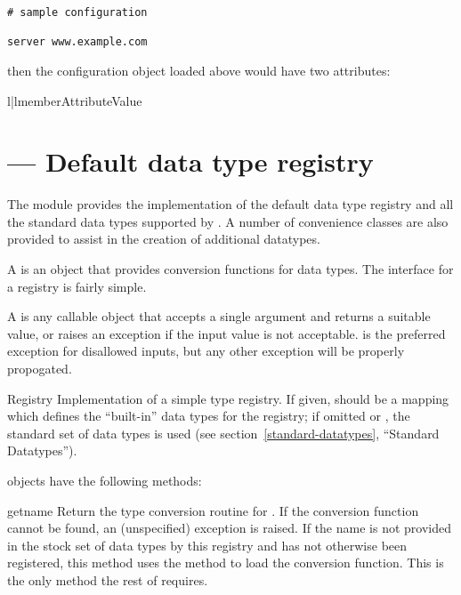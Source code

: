 \documentclass{howto}
\begin{document}
\begin{verbatim}
# sample configuration

server www.example.com
\end{verbatim}

then the configuration object  loaded above would have two
attributes:

\begin{tableii}{l|l}{member}{Attribute}{Value}
\end{tableii}


\section{ --- Default data type registry}


The  module provides the implementation of
the default data type registry and all the standard data types
supported by .  A number of convenience classes are
also provided to assist in the creation of additional datatypes.

A  is an object that provides conversion
functions for data types.  The interface for a registry is fairly
simple.

A  is any callable object that accepts a
single argument and returns a suitable value, or raises an exception
if the input value is not acceptable.   is the
preferred exception for disallowed inputs, but any other exception
will be properly propogated.

\begin{classdesc}{Registry}{}
  Implementation of a simple type registry.  If given, 
  should be a mapping which defines the ``built-in'' data types for
  the registry; if omitted or , the standard set of data
  types is used (see section~\ref{standard-datatypes}, ``Standard
   Datatypes'').
\end{classdesc}

 objects have the following methods:

\begin{methoddesc}{get}{name}
  Return the type conversion routine for .  If the
  conversion function cannot be found, an (unspecified) exception is
  raised.  If the name is not provided in the stock set of data types
  by this registry and has not otherwise been registered, this method
  uses the  method to load the conversion function.
  This is the only method the rest of  requires.
\end{methoddesc}
\end{document}

